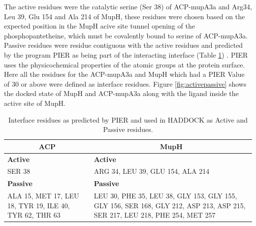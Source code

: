 	The active residues were the catalytic serine (Ser 38) of ACP-mupA3a and Arg34, Leu 39, Glu 154 and Ala 214 of MupH, these residues were chosen based on the expected position in the MupH acive site tunnel opening of the phosphopantetheine, which must be covalently bound to serine of ACP-mupA3a. Passive residues were residue contiguous with the active residues and predicted by the program PIER as being part of the interacting interface (Table \ref{tab: active_and_passive}) . PIER uses the physicochemical properties of the atomic groups at the protein surface. Here all the residues for the ACP-mupA3a and MupH which had a PIER Value of 30 or above were defined as interface residues. Figure  \ref{fig:activepassive} shows the docked state of MupH and ACP-mupA3a along with the ligand inside the active site of MupH.
	
	\begin{table}[htbp]
	\begin{small}
	\caption{Interface residues as predicted by PIER and used in HADDOCK as Active and Passive residues.}
	\label{tab: active_and_passive}	
	\begin{center}
	\begin{tabular}{p{7.5cm} p{7.5cm}}
	\toprule[2pt]
	\multicolumn{1}{c}{\textbf{ACP}} & \multicolumn{1}{c}{\textbf{MupH}} \\ 
	\midrule[1pt]
	\textbf{Active} & \textbf{Active} \\ 
	\multicolumn{1}{l}{SER 38} & ARG 34, LEU 39, GLU 154, ALA 214 \\
	\textbf{Passive} & \textbf{Passive} \\ 
	ALA 15, MET 17, LEU 18, TYR 19, ILE 40, TYR 62, THR 63 & LEU 30, PHE 35, LEU 38, GLY 153, GLY 155, GLY 156, SER 168, GLY 212, ASP 213, ASP 215, SER 217, LEU 218, PHE 254, MET 257 \\ 
	\bottomrule[2pt]
	\end{tabular}
	\end{center}
	\end{small}
	\end{table}


